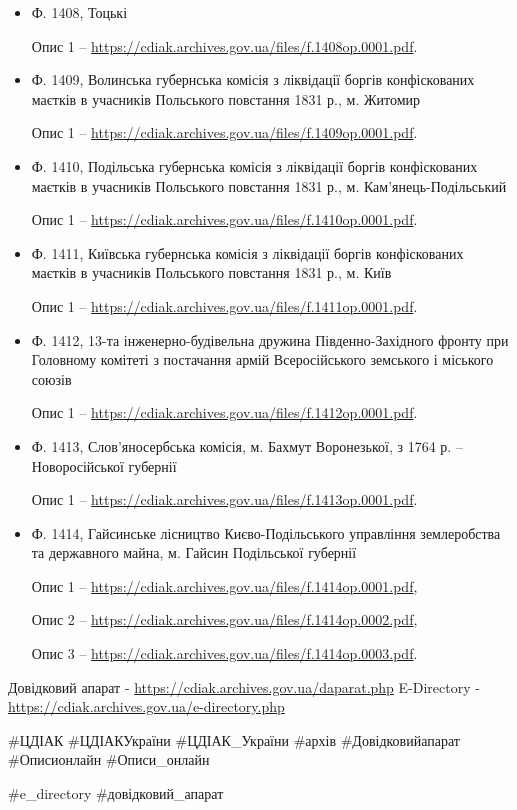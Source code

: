 \begin{itemize}
\item Ф. 1408, Тоцькі\par
   Опис 1 – \url{https://cdiak.archives.gov.ua/files/f.1408op.0001.pdf}.

\item Ф. 1409, Волинська губернська комісія з ліквідації боргів конфіскованих маєтків в учасників Польського повстання 1831 р., м. Житомир\par
   Опис 1 – \url{https://cdiak.archives.gov.ua/files/f.1409op.0001.pdf}.

\item Ф. 1410, Подільська губернська комісія з ліквідації боргів конфіскованих маєтків в учасників Польського повстання 1831 р., м. Кам’янець-Подільський\par
   Опис 1 – \url{https://cdiak.archives.gov.ua/files/f.1410op.0001.pdf}.

\item Ф. 1411, Київська губернська комісія з ліквідації боргів конфіскованих маєтків в учасників Польського повстання 1831 р., м. Київ\par
   Опис 1 – \url{https://cdiak.archives.gov.ua/files/f.1411op.0001.pdf}.

\item Ф. 1412, 13-та інженерно-будівельна дружина Південно-Західного фронту при Головному комітеті з постачання армій Всеросійського земського і міського союзів\par
   Опис 1 – \url{https://cdiak.archives.gov.ua/files/f.1412op.0001.pdf}.

\item Ф. 1413, Слов'яносербська комісія, м. Бахмут Воронезької, з 1764 р. – Новоросійської губернії\par
   Опис 1 – \url{https://cdiak.archives.gov.ua/files/f.1413op.0001.pdf}.

\item Ф. 1414, Гайсинське лісництво Києво-Подільського управління землеробства та державного майна, м. Гайсин Подільської губернії\par
   Опис 1 – \url{https://cdiak.archives.gov.ua/files/f.1414op.0001.pdf},\par
   Опис 2 – \url{https://cdiak.archives.gov.ua/files/f.1414op.0002.pdf},\par
   Опис 3 – \url{https://cdiak.archives.gov.ua/files/f.1414op.0003.pdf}.\par

\end{itemize} %

Довідковий апарат - \url{https://cdiak.archives.gov.ua/daparat.php}
E-Directory - \url{https://cdiak.archives.gov.ua/e-directory.php}

\#ЦДІАК \#ЦДІАКУкраїни \#ЦДІАК\_України \#архів \#Довідковийапарат \#Описионлайн \#Описи\_онлайн 

\#e\_directory \#довідковий\_апарат

